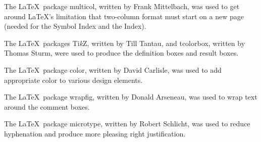 \begin{Itemize}
\item
The \LaTeX\ package \textsf{multicol}, written by Frank Mittelbach, was used to get around \LaTeX's limitation that two-column format must start on a new page (needed for the Symbol Index and the Index).

\item
The \LaTeX\ packages \textsf{Ti\textit{k}Z}, written by Till Tantau, and \textsf{tcolorbox}, written by Thomas Sturm, were used to produce the definition boxes and result boxes.

\item
The \LaTeX\ package \textsf{color}, written by David Carlisle, was used to add appropriate color to various design elements.

\item
The \LaTeX\ package \textsf{wrapfig}, written by Donald Arseneau, was used to wrap text around the comment boxes.

\item
The \LaTeX\ package \textsf{microtype}, written by Robert Schlicht, was used to reduce hyphenation and produce more pleasing right justification.

\end{Itemize}

\endinput 